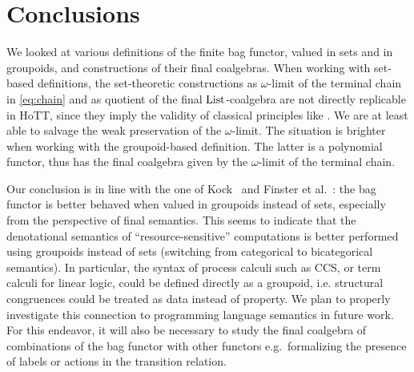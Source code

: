 \documentclass[final,a4paper,USenglish,cleveref]{lipics-v2021}
\begin{document}
\section{Conclusions}

We looked at various definitions of the finite bag functor, valued in sets and in groupoids, and constructions of their final coalgebras. When working with set-based definitions, the set-theoretic constructions as $\omega$-limit of the terminal chain in \eqref{eq:chain} and as quotient of the final $\List$-coalgebra are not directly replicable in HoTT, since they imply the validity of classical principles like \LLPO{}. We are at least able to salvage the weak preservation of the $\omega$-limit. The situation is brighter when working with the groupoid-based definition. The latter is a polynomial functor, thus has the final coalgebra given by the $\omega$-limit of the terminal chain.

Our conclusion is in line with the one of Kock~\cite{Kock2012} and Finster et al.~\cite{Finster2021}: the bag functor is better behaved when valued in groupoids instead of sets, especially from the perspective of final semantics. This seems to indicate that the denotational semantics of ``resource-sensitive'' computations %
is better performed using groupoids instead of sets (switching from categorical to bicategorical semantics).
In particular, the syntax of process calculi such as CCS, or term calculi for linear logic,  could be defined directly as a groupoid, i.e. structural congruences could be treated as data instead of property. We plan to properly investigate this connection to programming language semantics in future work. For this endeavor, it will also be necessary to study the final coalgebra of combinations of the bag functor with other functors e.g.~formalizing the presence of labels or actions in the transition relation.
\end{document}
